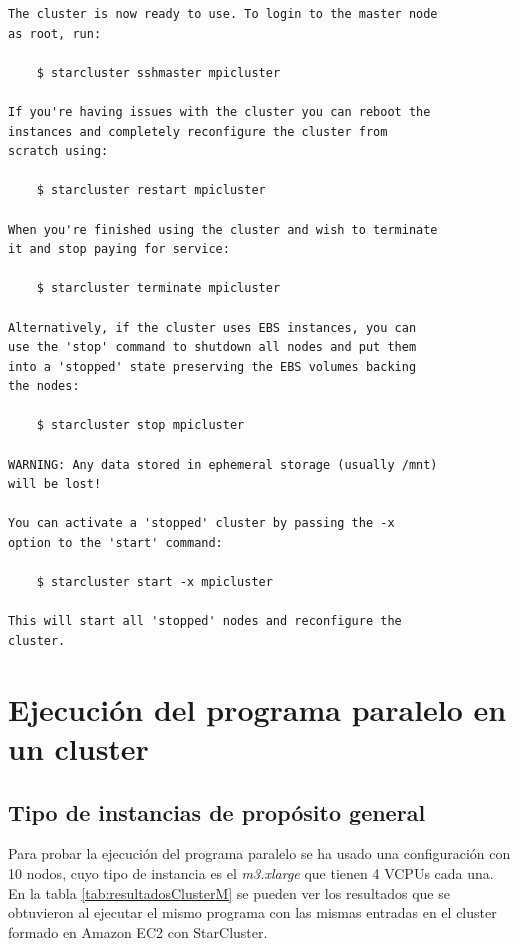 \documentclass{article}
\begin{document}
\begin{lstlisting}[style=miniBash]
The cluster is now ready to use. To login to the master node
as root, run:

    $ starcluster sshmaster mpicluster

If you're having issues with the cluster you can reboot the
instances and completely reconfigure the cluster from
scratch using:

    $ starcluster restart mpicluster

When you're finished using the cluster and wish to terminate
it and stop paying for service:

    $ starcluster terminate mpicluster

Alternatively, if the cluster uses EBS instances, you can
use the 'stop' command to shutdown all nodes and put them
into a 'stopped' state preserving the EBS volumes backing
the nodes:

    $ starcluster stop mpicluster

WARNING: Any data stored in ephemeral storage (usually /mnt)
will be lost!

You can activate a 'stopped' cluster by passing the -x
option to the 'start' command:

    $ starcluster start -x mpicluster

This will start all 'stopped' nodes and reconfigure the
cluster.
\end{lstlisting}
	
	

\section{Ejecución del programa paralelo en un cluster}\label{sec:ejStarCluster}

\subsection{Tipo de instancias de propósito general}\label{sec:ejM3}
	Para probar la ejecución del programa paralelo se ha usado una configuración con 10 nodos, cuyo tipo de instancia es el \emph{m3.xlarge} que tienen 4 VCPUs cada una. En la tabla \ref{tab:resultadosClusterM} se pueden ver los resultados que se obtuvieron al ejecutar el mismo programa con las mismas entradas en el cluster formado en Amazon EC2 con StarCluster.
\end{document}
